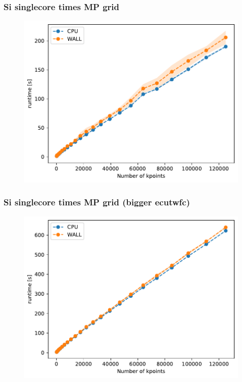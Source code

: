\documentclass{beamer}
\begin{document}
\begin{frame}
    \frametitle{Si singlecore times MP grid}
    \begin{figure}
        \includegraphics[width=\linewidth, height=\textheight,keepaspectratio]{si_bench_singlecore_kpoints.pdf}
    \end{figure}
\end{frame}

\begin{frame}
    \frametitle{Si singlecore times MP grid (bigger ecutwfc)}
    \begin{figure}
        \includegraphics[width=\linewidth, height=\textheight,keepaspectratio]{si_bench_singlecore_kpoints_max_ecut.pdf}
    \end{figure}
\end{frame}
\end{document}

